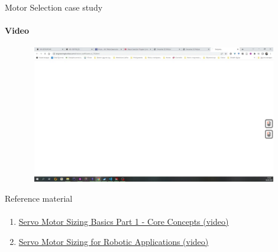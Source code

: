 \documentclass[aspectratio=169]{beamer}
\newcommand{\fbckg}[1]{\usebackgroundtemplate{\texttt{[image: \#1]}}}%
\begin{document}
\begin{frame}[t]{Motor Selection case study}
    \framesubtitle{Video}
    \vspace{-0.6cm}
    \begin{figure}[H]
        \href{https://disk.yandex.ru/d/K9CviPgYnftwrw}{
            \centering\includegraphics[height=6cm,width=1\textwidth,keepaspectratio]{motor_sizing_preview.png}}
        \label{fig:motor_sizing_preview.png}
    \end{figure}
\end{frame}

\begin{frame}[t]{Reference material}
    \framesubtitle{}
    \begin{enumerate}
        \item \href{https://youtu.be/4MaGqSQfYOk}{Servo Motor Sizing Basics Part 1 - Core Concepts (video)}
        \item \href{https://youtu.be/VJFDU31LQGM}{Servo Motor Sizing for Robotic Applications (video)}
    \end{enumerate}
\end{frame}



\fbckg{fibeamer/figs/last_page.png}
\frame[plain]{}
\end{document}
